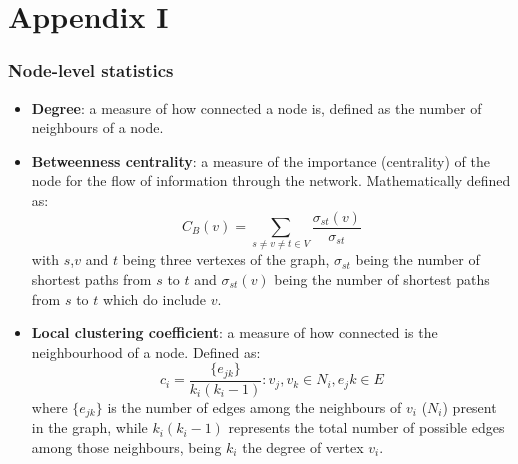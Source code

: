 \graphicspath{{chapters/90_appendix_i/images}}
\chapter*{Appendix I}


\subsection*{Node-level statistics}

\begin{itemize}\tightlist
  \item \textbf{Degree}: a measure of how connected a node is, defined as the number of neighbours of a node.
  \item \textbf{Betweenness centrality}: a measure of the importance (centrality) of the node for the flow of information through the network. Mathematically defined as:
  $$C_B(v) = \sum_{s \neq v \neq t \in V} \frac{\sigma_{st}(v)}{\sigma_{st}}$$
  with $s$,$v$ and $t$ being three vertexes of the graph, $\sigma_{st}$ being the number of shortest paths from $s$ to $t$ and $\sigma_{st}(v)$ being the number of shortest paths from $s$ to $t$ which do include $v$.
  \item \textbf{Local clustering coefficient}: a measure of how connected is the neighbourhood of a node. Defined as:
  $$c_i = \frac{\{e_{jk}\}}{k_i(k_i-1)} : v_j,v_k \in N_i, e_jk \in E$$
  where $\{e_{jk}\}$ is the number of edges among the neighbours of $v_i$ ($N_i$) present in the graph, while $k_i(k_i-1)$ represents the total number of possible edges among those neighbours, being $k_i$ the degree of vertex $v_i$.
\end{itemize}